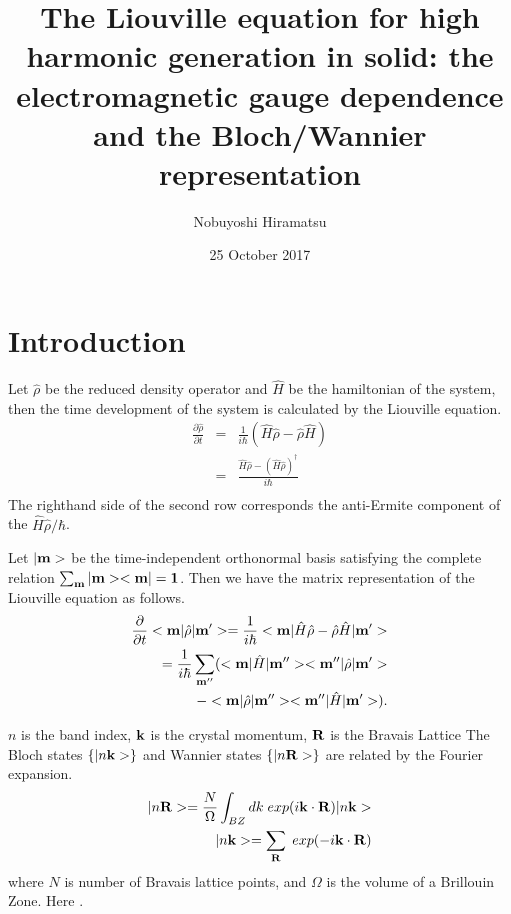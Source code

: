 \documentclass[aps,prb,reprint]{revtex4-1}
\begin{document}
\title{The Liouville equation for high harmonic generation in solid: the electromagnetic gauge dependence and the Bloch/Wannier representation}
\author{Nobuyoshi Hiramatsu}
\date{25 October 2017}
\maketitle

\section{Introduction}
Let $\hat{\rho}$ be the reduced density operator and $\hat{H}$ be the hamiltonian of the system, then the time development of the system is calculated by the Liouville equation.
\begin{eqnarray*}
\frac{\partial \hat{\rho} }{\partial t } &=& \frac{1}{i \hbar} ( \hat{H} \hat{\rho} - \hat{\rho} \hat{H} )\\
&=& \frac{\hat{H}\hat{\rho} - (\hat{H}\hat{\rho})^{\dag} }{i \hbar}  \\
\end{eqnarray*}
The righthand side of the second row corresponds the anti-Ermite component of the $\hat{H}\hat{\rho}/ \hbar$.

Let $|{\bf m}>$ be the time-independent orthonormal basis satisfying the complete relation $\sum_{\bf m} |{\bf m}><{\bf m}| = {\bf 1}$. Then we have the matrix representation of the Liouville equation as follows.
\begin{eqnarray*}
\frac{ \partial }{\partial t } <{\bf m}| \hat{\rho} |{\bf m'}> = \frac{1}{i \hbar}  <{\bf m}| \hat{H} \hat{\rho} - \hat{\rho} \hat{H} |{\bf m'}>\\
= \frac{1}{i \hbar}  \sum_{{\bf m''}} ( <{\bf m}| \hat{H} |{\bf m''}><{\bf m''}| \hat{\rho} |{\bf m'}> \\
 - <{\bf m}| \hat{\rho} |{\bf m''}><{\bf m''}| \hat{H} |{\bf m'}> ).\\
\end{eqnarray*} 


$n$ is the band index, $\bf k$ is the crystal momentum, ${\bf R} $ is the Bravais Lattice
The Bloch states $\{ |n{\bf k}> \}$ and Wannier states $\{ |n{\bf R}> \}$ are related by the Fourier expansion. 
\begin{eqnarray*}
|n{\bf R}>=\frac{N}{\Omega}\int_{BZ} dk \; exp(i{\bf k} \cdot {\bf R})|n{\bf k}>\\
|n{\bf k}>=\sum_{\bf R} \; exp(-i{\bf k} \cdot {\bf R}) \\
\end{eqnarray*} 
where $N$ is number of Bravais lattice points, and $\Omega$ is the volume of a Brillouin Zone. Here . 
\end{document}
